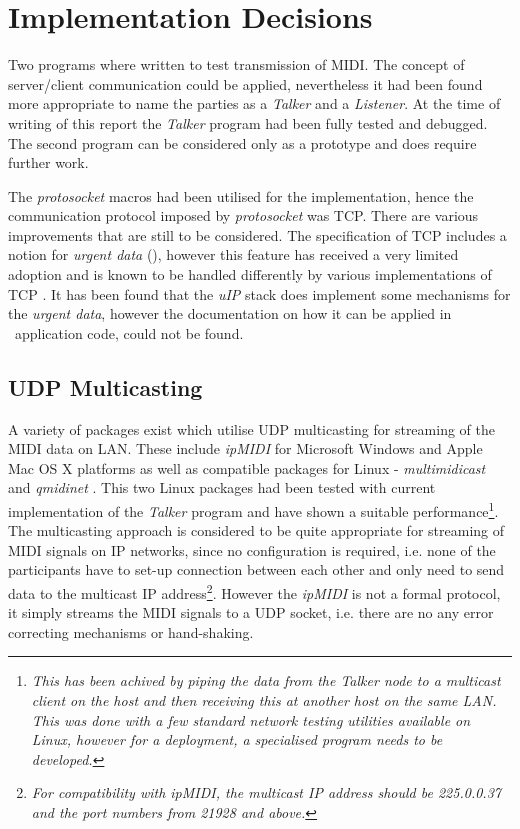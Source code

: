 \section{Implementation Decisions} \label{sec:MIDI}

  Two programs where written to test transmission of MIDI. The concept of
 server/client communication could be applied, nevertheless it had been
 found more appropriate to name the parties as a \emph{Talker} and a
 \emph{Listener}. At the time of writing of this report the \emph{Talker}
 program had been fully tested and debugged. The second program can be
 considered only as a prototype and does require further work.

  The \emph{protosocket} macros had been utilised for the implementation,
 hence the communication protocol imposed by \emph{protosocket} was TCP.
 There are various improvements that are still to be considered.
 The specification of TCP includes a notion for \emph{urgent data}
 (), however this feature has received a very limited adoption
 and is known to be handled differently by various implementations of TCP
 \cite{ietf:draft:tcpm:urgdata}. It has been found that the \emph{uIP}
 stack does implement some mechanisms for the \emph{urgent data}, however
 the documentation on how it can be applied in \Contiki\ application code,
 could not be found. 


\subsection{UDP Multicasting}

  A variety of packages exist which utilise UDP multicasting for streaming
 of the MIDI data on LAN. These include \emph{ipMIDI} \cite{links:ipmidi} for
 Microsoft Windows and Apple Mac OS X platforms as well as compatible
 packages for Linux - \emph{multimidicast} \cite{links:multimidicast} and
 \emph{qmidinet} \cite{links:qmidinet}. This two Linux packages had been
 tested with current implementation of the \emph{Talker} program and have
 shown a suitable performance\footnote{\emph{This has been achived by
 piping the data from the Talker node to a multicast client on the host and
 then receiving this at another host on the same LAN. This was done with
 a few standard network testing utilities available on Linux, however for
 a deployment, a specialised program needs to be developed.}}. The multicasting
 approach is considered to be quite appropriate for streaming of MIDI signals
 on IP networks, since no configuration is required, i.e. none of the
 participants have to set-up connection between each other and only need
 to send data to the multicast IP address\footnote{\emph{For compatibility
 with ipMIDI, the multicast IP
 address should be 225.0.0.37 and the port numbers from 21928 and above.}}.
 However the \emph{ipMIDI} is not a formal protocol, it simply streams the
 MIDI signals to a UDP socket, i.e. there are no any error correcting
 mechanisms or hand-shaking.

